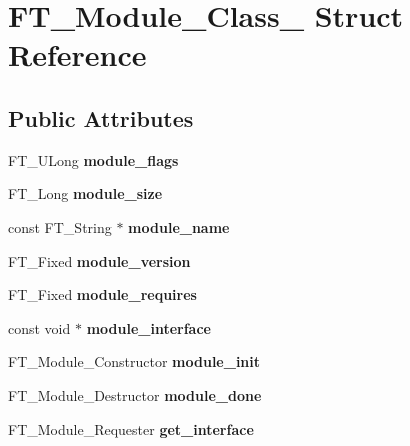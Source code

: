 \hypertarget{struct_f_t___module___class__}{}\section{F\+T\+\_\+\+Module\+\_\+\+Class\+\_\+ Struct Reference}
\label{struct_f_t___module___class__}
\subsection*{Public Attributes}
\begin{DoxyCompactItemize}
\item 
\mbox{\label{struct_f_t___module___class___a54a02a3767955cd8fa0cd786bd1f9515}} 
F\+T\+\_\+\+U\+Long {\bfseries module\+\_\+flags}
\item 
\mbox{\label{struct_f_t___module___class___a2582eeab364e4fbbd5d1e420bfcf3207}} 
F\+T\+\_\+\+Long {\bfseries module\+\_\+size}
\item 
\mbox{\label{struct_f_t___module___class___af25b9e32b6c91e0c31560efb62886ed7}} 
const F\+T\+\_\+\+String $\ast$ {\bfseries module\+\_\+name}
\item 
\mbox{\label{struct_f_t___module___class___a5b649f1965c42fd8c54bbc370fbf60b4}} 
F\+T\+\_\+\+Fixed {\bfseries module\+\_\+version}
\item 
\mbox{\label{struct_f_t___module___class___a24772981bd972d342f54a6e1704f85c3}} 
F\+T\+\_\+\+Fixed {\bfseries module\+\_\+requires}
\item 
\mbox{\label{struct_f_t___module___class___a320168f227e2d268691429ac0c6b2900}} 
const void $\ast$ {\bfseries module\+\_\+interface}
\item 
\mbox{\label{struct_f_t___module___class___a60f2bb9eee68366f20fe0613f347ffbd}} 
F\+T\+\_\+\+Module\+\_\+\+Constructor {\bfseries module\+\_\+init}
\item 
\mbox{\label{struct_f_t___module___class___ab6e9c780519e24a51144df79692cf339}} 
F\+T\+\_\+\+Module\+\_\+\+Destructor {\bfseries module\+\_\+done}
\item 
\mbox{\label{struct_f_t___module___class___aa72d79fcd0991231e24e88f359244e8e}} 
F\+T\+\_\+\+Module\+\_\+\+Requester {\bfseries get\+\_\+interface}
\end{DoxyCompactItemize}


